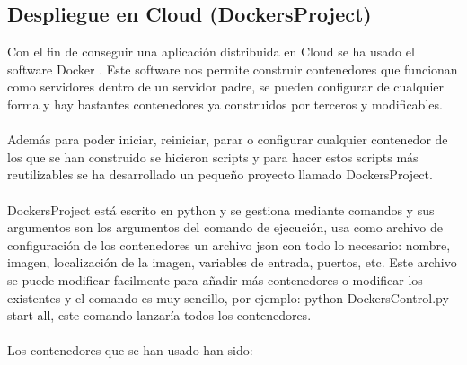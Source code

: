 \documentclass[14pt]{extarticle}
\theoremstyle{definition}
\theoremstyle{remark}
\begin{document}
\subsection{Despliegue en Cloud (DockersProject)}\label{sec:dockersproject}
Con el fin de conseguir una aplicación distribuida en Cloud se ha usado el software Docker \citep{wiki:docker}. Este software nos permite construir contenedores que funcionan como servidores dentro de un servidor padre, se pueden configurar de cualquier forma y hay bastantes contenedores ya construidos por terceros y modificables.\\\\Además para poder iniciar, reiniciar, parar o configurar cualquier contenedor de los que se han construido se hicieron scripts y para hacer estos scripts más reutilizables se ha desarrollado un pequeño proyecto llamado DockersProject.\\\\DockersProject está escrito en python y se gestiona mediante comandos y sus argumentos son los argumentos del comando de ejecución, usa como archivo de configuración de los contenedores un archivo json con todo lo necesario: nombre, imagen, localización de la imagen, variables de entrada, puertos, etc. Este archivo se puede modificar facilmente para añadir más contenedores o modificar los existentes y el comando es muy sencillo, por ejemplo: python DockersControl.py --start-all, este comando lanzaría todos los contenedores.\\\\Los contenedores que se han usado han sido:
\end{document}
